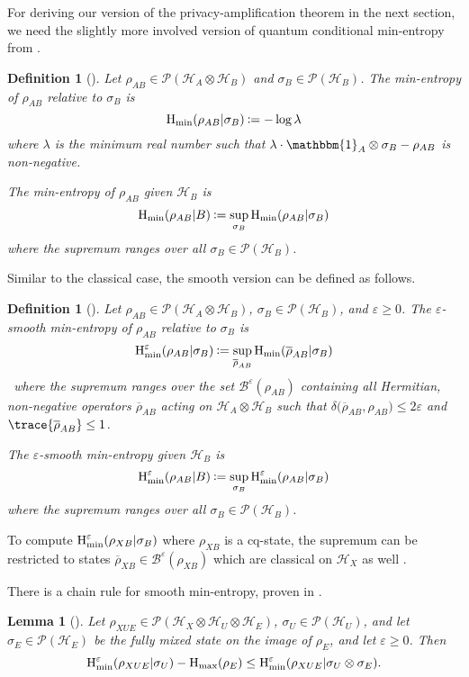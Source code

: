\documentclass[final,11pt,a4paper]{report}
\newtheorem{definition}[theorem]{Definition}
\newtheorem{lemma}[theorem]{Lemma}
\newcommand*{\assign}{\ensuremath{\kern.5ex\raisebox{.1ex}{\mbox{\rm:}}\kern -.3em =}}
\newcommand*{\ol}[1]{\overline{#1}}
\renewcommand*{\id}{\mathbbm{1}}   %
\newcommand*{\cB}{\mathcal{B}}
\newcommand*{\cH}{\mathcal{H}}
\newcommand*{\dens}[1]{\mathcal{P}(#1)}  %
\renewcommand*{\H}{\operatorname{H}}   %
\newcommand*{\qhmin}{\ensuremath{\H_{\rm min}}}  %
\newcommand*{\qhmax}{\ensuremath{\H_{\rm max}}}  %
\newcommand*{\hminee}{\qhmin^{\varepsilon}} %
\newcommand*{\dist}[1]{\delta\big(#1\big)}  %
\newcommand*{\eps}{\varepsilon}
\begin{document}
For deriving our version of the privacy-amplification theorem in the
next section, we need the slightly more involved version of quantum
conditional min-entropy from \cite{Renner05}.
\begin{definition}[\cite{Renner05}] \label{def:qminentropy}
Let $\rho_{AB} \in \dens{\cH_A \otimes \cH_B}$ and $\sigma_B \in
\dens{\cH_B}$. The min-entropy of $\rho_{AB}$ relative to $\sigma_B$
is 
\[ \qhmin(\rho_{AB} | \sigma_B) \assign - \log \lambda
\]
where $\lambda$ is the minimum real number such that $\lambda \cdot \id_A
\otimes \sigma_B - \rho_{AB}$ is non-negative.

The min-entropy of $\rho_{AB}$ given $\cH_B$ is
\[ \qhmin(\rho_{AB} | B) \assign \sup_{\sigma_B} \qhmin(\rho_{AB} | \sigma_B)
\]
where the supremum ranges over all $\sigma_B \in \dens{\cH_B}$.
\end{definition}

Similar to the classical case, the smooth version can be defined as follows.
\begin{definition}[\cite{Renner05}] \label{def:qsmoothminentropy}
Let $\rho_{AB} \in \dens{\cH_A \otimes \cH_B}$, $\sigma_B \in
\dens{\cH_B}$, and $\eps \geq 0$. The $\eps$-smooth min-entropy of
$\rho_{AB}$ relative to $\sigma_B$ is 
\[ \hminee(\rho_{AB} | \sigma_B) \assign \sup_{\ol{\rho}_{AB}} \qhmin(\ol{\rho}_{AB} | \sigma_B)
\]\
where the supremum ranges over the set $\cB^{\eps}(\rho_{AB})$
containing all Hermitian, non-negative operators $\ol{\rho}_{AB}$
acting on $\cH_A \otimes \cH_B$ such that $\dist{ \ol{\rho}_{AB},
\rho_{AB} } \leq 2 \eps$ and $\trace{\ol{\rho}_{AB}} \leq 1$.

The $\eps$-smooth min-entropy given $\cH_B$ is
\[ \hminee(\rho_{AB} | B) \assign \sup_{\sigma_B} \hminee(\rho_{AB} | \sigma_B)
\]
where the supremum ranges over all $\sigma_B \in \dens{\cH_B}$.
\end{definition}
To compute $\hminee(\rho_{XB} | \sigma_B)$ where $\rho_{XB}$ is a
cq-state, the supremum can be restricted to states
$\ol{\rho}_{XB} \in \cB^{\eps}(\rho_{XB})$ which are classical on
$\cH_X$ as well \cite[Remark~3.2.4]{Renner05}.

There is a chain rule for smooth min-entropy, proven in \cite[Lemma
3.2.9]{Renner05}.
\begin{lemma}[\cite{Renner05}] \label{lem:qchainrule}
  Let $\rho_{XUE} \in \dens{\cH_X \otimes \cH_U \otimes \cH_E}$,
  $\sigma_U \in \dens{\cH_U}$, and let $\sigma_E \in \dens{\cH_E}$ be
  the fully mixed state on the image of $\rho_E$, and let $\eps \geq
  0$. Then
\[ \hminee(\rho_{XUE} | \sigma_U) - \qhmax(\rho_E) \leq
  \hminee(\rho_{XUE} | \sigma_U \otimes \sigma_E).
\]
\end{lemma}
\end{document}
